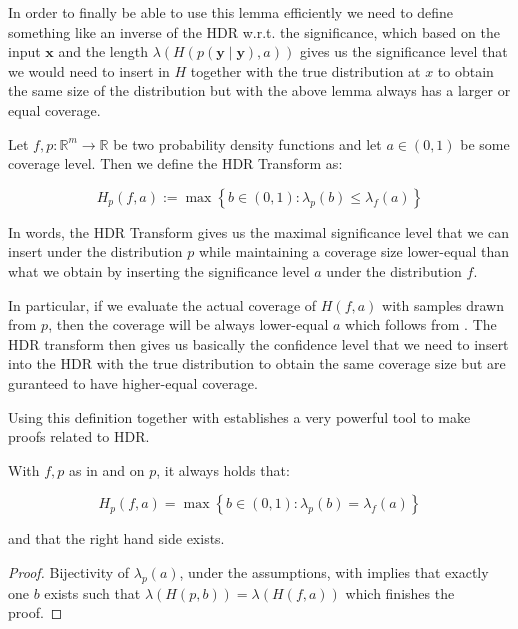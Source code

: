 In order to finally be able to use this lemma efficiently we need to define something like an inverse of the HDR w.r.t. the significance, which based on the input $\mathbf{x}$ and the length $\lambda(H(p(\mathbf{y} \mid \mathbf{y}), a))$ gives us the significance level that we would need to insert in $H$ together with the true distribution at $x$ to obtain the same size of the distribution but with the above lemma always has a larger or equal coverage.

\begin{definition}\label{def:hdr_transform}
    Let $f,p : \mathbb{R}^m \to \mathbb{R}$ be two probability density functions and let $a \in (0,1)$ be some coverage level. Then we define the HDR Transform as:

    \begin{equation}
        H_p(f, a) := \max \left\{b \in (0,1):  \lambda_p(b) \leq \lambda_f(a)\right\}
    \end{equation}

\end{definition}
In words, the HDR Transform gives us the maximal significance level that we can insert under the distribution $p$ while maintaining a coverage size lower-equal than what we obtain by inserting the significance level $a$ under the distribution $f$.

In particular, if we evaluate the actual coverage of $H(f, a)$ with samples drawn from $p$, then the coverage will be always lower-equal $a$ which follows from . The HDR transform then gives us basically the confidence level that we need to insert into the HDR with the true distribution to obtain the same coverage size but are guranteed to have higher-equal coverage.

Using this definition together with  establishes a very powerful tool to make proofs related to HDR.

\begin{lemma}\label{lem:hdr_optimality}
    With $f,p$ as in  and  on $p$, it always holds that:

    \begin{equation}
        H_p(f, a) = \max \left\{b \in (0,1): \lambda_p(b) = \lambda_f(a)\right\}
    \end{equation}

    and that the right hand side exists.
\end{lemma}
\begin{proof}
    Bijectivity of $\lambda_p(a)$, under the assumptions, with  implies that exactly one $b$ exists such that $\lambda(H(p, b)) = \lambda(H(f, a))$ which finishes the proof.
\end{proof}


